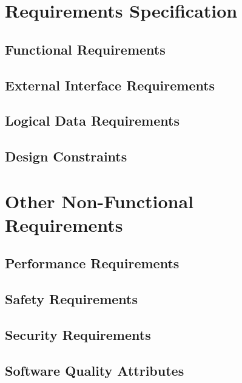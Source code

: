 \documentclass[11pt]{article}
\begin{document}
\section{Requirements Specification}
\label{sec:specification}

\subsection{Functional Requirements}
\label{sec:functional}

\subsection{External Interface Requirements}
\label{sec:external-interface}

\subsection{Logical Data Requirements}
\label{sec:logical}

\subsection{Design Constraints}
\label{sec:constraints}

\section{Other Non-Functional Requirements}
\label{sec:non-functional}

\subsection{Performance Requirements}
\label{sec:performance}

\subsection{Safety Requirements}
\label{sec:safety}

\subsection{Security Requirements}
\label{sec:security}

\subsection{Software Quality Attributes}
\label{sec:quality}
\end{document}
